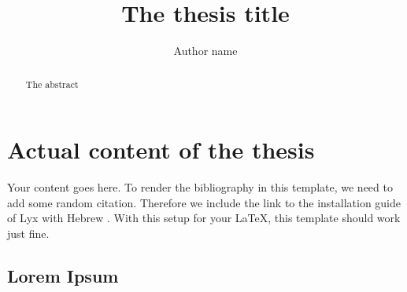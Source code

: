\documentclass[12pt, final, hebrewstretch=1.3]{biumasterthesis}
\title{The thesis title}
\author{Author name}
\begin{document}
\maketitle

\makeadvisorspage
\makeackpage

\tableofcontents

\begin{abstract}
	The abstract
\end{abstract}

\section{Actual content of the thesis}
Your content goes here.
To render the bibliography in this template, we need to add some random citation. Therefore we include the link to the installation guide of Lyx with Hebrew \cite{lyxguide}. With this setup for your \LaTeX, this template should work just fine.
\subsection{Lorem Ipsum}
\lipsum\lipsum




\end{document}
